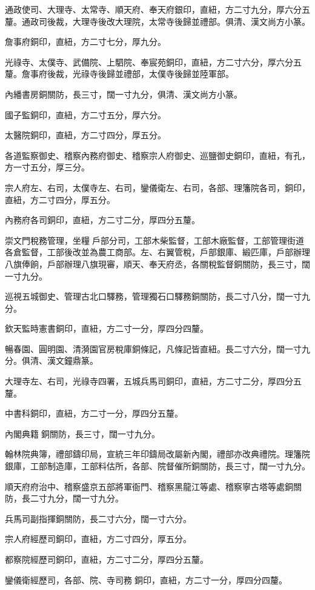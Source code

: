 \begin{pinyinscope}
通政使司、大理寺、太常寺、順天府、奉天府銀印，直紐，方二寸九分，厚六分五釐。通政司後裁，大理寺後改大理院，太常寺後歸並禮部。俱清、漢文尚方小篆。

詹事府銅印，直紐，方二寸七分，厚九分。

光祿寺、太僕寺、武備院、上駟院、奉宸苑銅印，直紐，方二寸六分，厚六分五釐。詹事府後裁，光祿寺後歸並禮部，太僕寺後歸並陸軍部。

內繙書房銅關防，長三寸，闊一寸九分，俱清、漢文尚方小篆。

國子監銅印，直紐，方二寸五分，厚六分。

太醫院銅印，直紐，方二寸四分，厚五分。

各道監察御史、稽察內務府御史、稽察宗人府御史、巡鹽御史銅印，直紐，有孔，方一寸五分，厚三分。

宗人府左、右司，太僕寺左、右司，鑾儀衛左、右司，各部、理籓院各司，銅印，直紐，方二寸四分，厚五分。

內務府各司銅印，直紐，方二寸二分，厚四分五釐。

崇文門稅務管理，坐糧戶部分司，工部木柴監督，工部木廠監督，工部管理街道各倉監督，工部後改並為農工商部。左、右翼管稅，戶部銀庫、緞匹庫，戶部辦理八旗俸餉，戶部辦理八旗現審，順天、奉天府丞，各關稅監督銅關防，長三寸，闊一寸九分。

巡視五城御史、管理古北口驛務，管理獨石口驛務銅關防，長二寸八分，闊一寸九分。

欽天監時憲書銅印，直紐，方二寸一分，厚四分四釐。

暢春園、圓明園、清漪園官房稅庫銅條記，凡條記皆直紐。長二寸六分，闊一寸九分。俱清、漢文鐘鼎篆。

大理寺左、右司，光祿寺四署，五城兵馬司銅印，直紐，方二寸二分，厚四分五釐。

中書科銅印，直紐，方二寸一分，厚四分五釐。

內閣典籍銅關防，長三寸，闊一寸九分。

翰林院典簿，禮部鑄印局，宣統三年印鑄局改屬新內閣，禮部亦改典禮院。理籓院銀庫，工部制造庫，工部料估所，各部、院督催所銅關防，長三寸，闊一寸九分。

順天府府治中、稽察盛京五部將軍衙門、稽察黑龍江等處、稽察寧古塔等處銅關防，長二寸九分，闊一寸九分。

兵馬司副指揮銅關防，長二寸六分，闊一寸六分。

宗人府經歷司銅印，直紐，方二寸四分，厚五分。

都察院經歷司銅印，直紐，方二寸二分，厚四分五釐。

鑾儀衛經歷司，各部、院、寺司務銅印，直紐，方二寸一分，厚四分四釐。


\end{pinyinscope}
